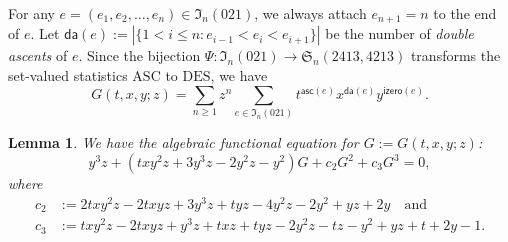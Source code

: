 \documentclass[12pt]{amsart}
\numberwithin{equation}{section}
\theoremstyle{plain}
\newtheorem{lemma}[theorem]{Lemma}
\theoremstyle{definition}
\newcommand{\I}{\mathfrak{I}}
\def\S{\mathfrak{S}}
\def\DES{\mathrm{DES}}
\def\ASC{\mathrm{ASC}}
\def\asc{\mathsf{asc}}
\def\izero{\mathsf{izero}}
\def\da{\mathsf{da}}
\begin{document}
For any $e=(e_1,e_2,\ldots,e_n)\in\I_n(021)$, we always attach $e_{n+1}=n$ to the end of $e$. Let $\da(e):=|\{1< i\leq n: e_{i-1}<e_i<e_{i+1}\}|$ be the number of {\em double ascents} of $e$. Since the bijection $\Psi:\I_n(021)\rightarrow\S_n(2413,4213)$ transforms the set-valued statistics $\ASC$ to $\DES$, we have 
$$
G(t,x,y;z)=\sum_{n\geq1}z^n\sum_{e\in\I_n(021)}t^{\asc(e)}x^{\da(e)}y^{\izero(e)}. 
$$

\begin{lemma}\label{lem:eq021}
We have the algebraic functional equation for $G:=G(t,x,y;z)$:
\begin{equation}\label{funeq:021}
y^3z+(txy^2z+3y^3z-2y^2z-y^2)G+c_2G^2+c_3G^3=0,
\end{equation}
where 
\begin{align*}
c_2&:=2txy^2z-2txyz+3y^3z+tyz-4y^2z-2y^2+yz+2y\quad\text{and}\\
c_3&:=txy^2z-2txyz+y^3z+txz+tyz-2y^2z-tz-y^2+yz+t+2y-1.
\end{align*}
\end{lemma}
\end{document}
